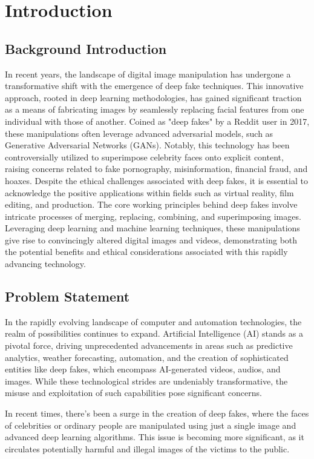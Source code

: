      \chapter{Introduction}
        \section{Background Introduction}
        In recent years, the landscape of digital image manipulation has undergone a transformative shift with the emergence of deep fake techniques. This innovative approach, rooted in deep learning methodologies, has gained significant traction as a means of fabricating images by seamlessly replacing facial features from one individual with those of another. Coined as "deep fakes" by a Reddit user in 2017, these manipulations often leverage advanced adversarial models, such as Generative Adversarial Networks (GANs). Notably, this technology has been controversially utilized to superimpose celebrity faces onto explicit content, raising concerns related to fake pornography, misinformation, financial fraud, and hoaxes.
        Despite the ethical challenges associated with deep fakes, it is essential to acknowledge the positive applications within fields such as virtual reality, film editing, and production. The core working principles behind deep fakes involve intricate processes of merging, replacing, combining, and superimposing images. Leveraging deep learning and machine learning techniques, these manipulations give rise to convincingly altered digital images and videos, demonstrating both the potential benefits and ethical considerations associated with this rapidly advancing technology.
        \section{Problem Statement}
        In the rapidly evolving landscape of computer and automation technologies, the realm of possibilities continues to expand. Artificial Intelligence (AI) stands as a pivotal force, driving unprecedented advancements in areas such as predictive analytics, weather forecasting, automation, and the creation of sophisticated entities like deep fakes, which encompass AI-generated videos, audios, and images. While these technological strides are undeniably transformative, the misuse and exploitation of such capabilities pose significant concerns. 

        In recent times, there's been a surge in the creation of deep fakes, where the faces of celebrities or ordinary people are manipulated using just a single image and advanced deep learning algorithms. This issue is becoming more significant, as it circulates potentially harmful and illegal images of the victims to the public.

